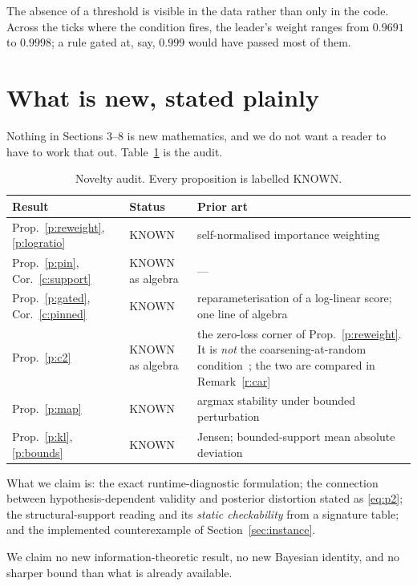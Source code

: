 \documentclass[11pt,a4paper]{article}
\theoremstyle{definition}
\begin{document}
The absence of a threshold is visible in the data rather than only in the
code. Across the ticks where the condition fires, the leader's weight ranges
from $0.9691$ to $0.9998$; a rule gated at, say, $0.999$ would have
passed most of them.

\section{What is new, stated plainly}

Nothing in Sections 3--8 is new mathematics, and we do not want a reader to
have to work that out. Table~\ref{tab:novelty} is the audit.

\begin{table}[h]
\centering
\small
\begin{tabular}{llp{}}
\toprule
Result & Status & Prior art \\
\midrule
Prop.~\ref{p:reweight}, \ref{p:logratio} & KNOWN & self-normalised importance
weighting \\
Prop.~\ref{p:pin}, Cor.~\ref{c:support} & KNOWN as algebra & --- \\
Prop.~\ref{p:gated}, Cor.~\ref{c:pinned} & KNOWN & reparameterisation of a
log-linear score; one line of algebra \\
Prop.~\ref{p:c2} & KNOWN as algebra & the zero-loss corner of
Prop.~\ref{p:reweight}. It is \emph{not} the coarsening-at-random
condition~\cite{heitjan1991car}; the two are compared in
Remark~\ref{r:car} \\
Prop.~\ref{p:map} & KNOWN & argmax stability under bounded perturbation \\
Prop.~\ref{p:kl}, \ref{p:bounds} & KNOWN & Jensen; bounded-support mean
absolute deviation \\
\bottomrule
\end{tabular}
\caption{Novelty audit. Every proposition is labelled KNOWN.}
\label{tab:novelty}
\end{table}

What we claim is: the exact runtime-diagnostic formulation; the connection
between hypothesis-dependent validity and posterior distortion stated as
\eqref{eq:p2}; the structural-support reading and its
\emph{static checkability} from a signature table; and the implemented
counterexample of Section~\ref{sec:instance}.

We claim no new information-theoretic result, no new Bayesian identity, and no
sharper bound than what is already available.
\end{document}
